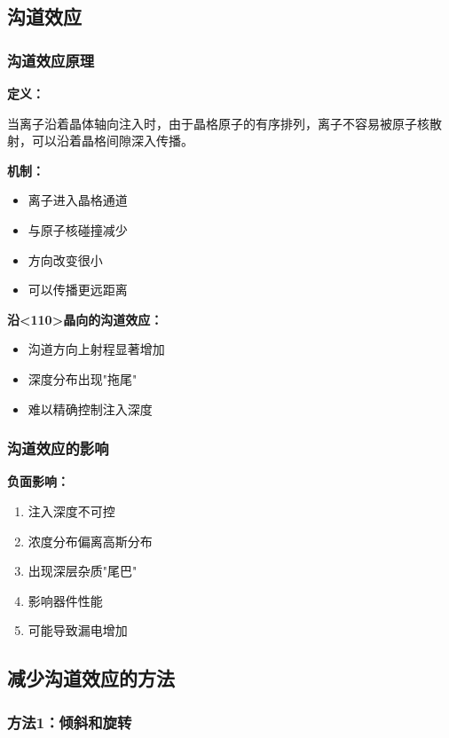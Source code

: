 \documentclass[UTF8,12pt,a4paper]{ctexart}
\begin{document}
\subsection{沟道效应}

\subsubsection{沟道效应原理}

\textbf{定义：}

当离子沿着晶体轴向注入时，由于晶格原子的有序排列，离子不容易被原子核散射，可以沿着晶格间隙深入传播。

\textbf{机制：}
\begin{itemize}
    \item 离子进入晶格通道
    \item 与原子核碰撞减少
    \item 方向改变很小
    \item 可以传播更远距离
\end{itemize}

\textbf{沿<110>晶向的沟道效应：}
\begin{itemize}
    \item 沟道方向上射程显著增加
    \item 深度分布出现"拖尾"
    \item 难以精确控制注入深度
\end{itemize}

\subsubsection{沟道效应的影响}

\textbf{负面影响：}
\begin{enumerate}
    \item 注入深度不可控
    \item 浓度分布偏离高斯分布
    \item 出现深层杂质"尾巴"
    \item 影响器件性能
    \item 可能导致漏电增加
\end{enumerate}

\subsection{减少沟道效应的方法}

\subsubsection{方法1：倾斜和旋转}
\end{document}
